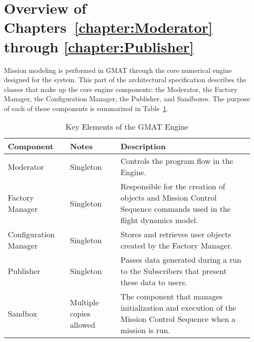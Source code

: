 
\setcounter{footnote}{0}

\section*{Overview of Chapters~\ref{chapter:Moderator} through \ref{chapter:Publisher}}

Mission modeling is performed in GMAT through the core numerical engine designed for the system.
This part of the architectural specification describes the classes that make up the core engine
components: the Moderator, the Factory Manager, the Configuration Manager, the Publisher, and
Sandboxes.  The purpose of each of these components is summarized in
Table~\ref{table:EngineComponents}.

\begin{table}[H]
\begin{center}
\caption{\label{table:EngineComponents}Key Elements of the GMAT Engine}
\setlength\extrarowheight{2pt}
\begin{tabular}{|p{1.4in}|p{1in}|p{3.4in}|}
\hline
Component & Notes & Description \\
\hline
\hline
Moderator & Singleton & Controls the program flow in the Engine.\\
Factory Manager & Singleton & Responsible for the creation of objects and Mission Control
Sequence commands used in the flight dynamics model.\\
Configuration Manager & Singleton & Stores and retrieves user objects created by the
Factory Manager.\\
Publisher & Singleton & Passes data generated during a run to the Subscribers that present these
data to users.\\
Sandbox & Multiple copies allowed\footnotemark & The component that manages initialization and
execution of the Mission Control Sequence when a mission is run.\\
\hline
\end{tabular}
\end{center}
\end{table}

